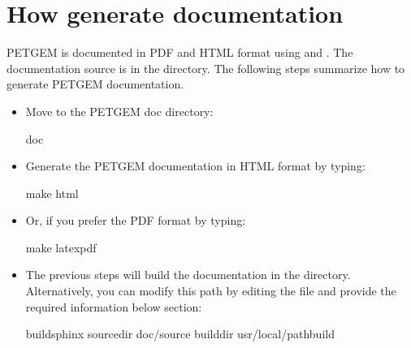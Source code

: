 \documentclass[letterpaper,10pt,english]{sphinxmanual}
\begin{document}
\section{How generate documentation}
\label{\detokenize{Manual:how-generate-documentation}}\label{\detokenize{Manual:id2}}
PETGEM is documented in PDF and HTML format using  and
. The documentation source
is in the  directory. The following steps summarize how to generate PETGEM documentation.
\begin{itemize}
\item {} 
Move to the PETGEM doc directory:

\begin{sphinxVerbatim}[commandchars=\\\{\}]
\PYGZdl{}  doc
\end{sphinxVerbatim}

\item {} 
Generate the PETGEM documentation in HTML format by typing:

\begin{sphinxVerbatim}[commandchars=\\\{\}]
\PYGZdl{} make html
\end{sphinxVerbatim}

\item {} 
Or, if you prefer the PDF format by typing:

\begin{sphinxVerbatim}[commandchars=\\\{\}]
\PYGZdl{} make latexpdf
\end{sphinxVerbatim}

\item {} 
The previous steps will build the documentation in the  directory. Alternatively, you can modify this path by editing the file  and provide the required information below  section:

\begin{sphinxVerbatim}[commandchars=\\\{\}]
\PYG{o}{[}build\PYGZus{}sphinx\PYG{o}{]}
source\PYGZhy{}dir  doc/source
build\PYGZhy{}dir   usr/local/path\PYGZhy{}build
   
\end{sphinxVerbatim}

\end{itemize}
\end{document}
